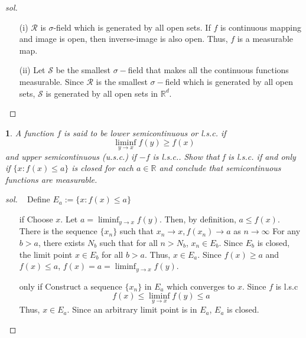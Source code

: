 \documentclass{report}
\newtheorem{ex}{}[section]
\begin{document}
\begin{proof}[sol]~
\begin{enumerate}
    \item[(i)] $\mathcal{R}$ is $\sigma$-field which is generated by all open sets. If $f$ is continuous mapping and image is open, then inverse-image is also open. Thus, $f$ is a measurable map.
    \item[(ii)] Let $\mathcal{S}$ be the smallest $\sigma-$field that makes all the continuous functions measurable. Since $\mathcal{R}$ is the smallest $\sigma-$field which is generated by all open sets,  $\mathcal{S}$ is generated by all open sets in $\mathbb{R}^d$.
\end{enumerate}
\end{proof}
\begin{ex}
A function $f$ is said to be lower semicontinuous or l.s.c. if
\[\liminf_{y\to x} f(y) \ge f(x)\]
and upper semicontinuous (u.s.c.) if $-f$ is l.s.c.. Show that f is l.s.c. if
and only if $\{x : f(x) \le a\}$ is closed for each $a \in \mathbb{R}$ and conclude that
semicontinuous functions are measurable.
\end{ex}
\begin{proof}[sol]~
Define $E_a := \{x : f(x) \le a\}$
\begin{enumerate}
    \item[if] Choose $x$. Let $a = \liminf_{y\to x}{f(y)}$. Then, by definition, $a \le f(x)$.
    There is the sequence $\{x_n\}$ such that $x_n \to x, f(x_n) \to a$ as $n \to \infty$
    For any $b > a$, there exists $N_b$ such that for all $n > N_b$, $x_n \in E_b$. Since $E_b$ is closed, the limit point $x \in E_b$ for all $b > a$. Thus, $x \in E_a$. Since $f(x) \ge a$ and $f(x) \le a$, $f(x) = a = \liminf_{y\to x} f(y)$. 
    \item[only if] Construct a sequence $\{x_n\}$ in $E_a$ which converges to $x$. Since $f$ is l.s.c
    \[f(x) \le \liminf_{y\to x} f(y) \le a\]
    Thus, $x \in E_a$. Since an arbitrary limit point is in $E_a$, $E_a$ is closed.
\end{enumerate}
\end{proof}
\end{document}
